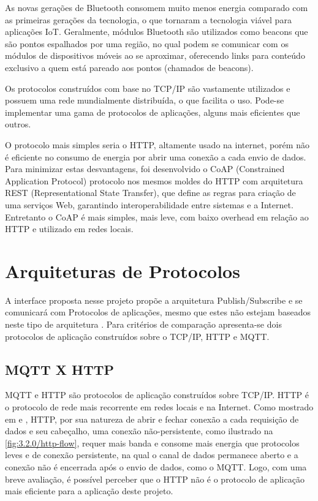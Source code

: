 As novas gerações de Bluetooth consomem muito menos energia comparado com as primeiras gerações da tecnologia, o que tornaram a tecnologia viável para aplicações IoT. Geralmente, módulos Bluetooth são utilizados como beacons \cite{Endeavor:Beacons} que são  pontos espalhados por uma região, no qual podem se comunicar com os módulos de dispositivos móveis ao se aproximar, oferecendo links para conteúdo exclusivo a quem está pareado aos pontos (chamados de beacons).

Os protocolos construídos com base no TCP/IP são vastamente utilizados e possuem uma rede mundialmente distribuída, o que facilita o uso. Pode-se implementar uma gama de protocolos de aplicações, alguns mais eficientes que outros.

O protocolo mais simples seria o HTTP, altamente usado na internet, porém não é eficiente no consumo de energia por abrir uma conexão a cada envio de dados. Para minimizar estas desvantagens, foi desenvolvido o CoAP (Constrained Application Protocol) \cite{coap} protocolo nos mesmos moldes do HTTP com arquitetura REST (Representational State Transfer), que define as regras para criação de uma serviços Web, garantindo interoperabilidade entre sistemas e a Internet. Entretanto o CoAP é mais simples, mais leve, com baixo overhead em relação ao HTTP e utilizado em redes locais.

\section{Arquiteturas de Protocolos}
\label{section:arquitetura_protocolo}


A interface proposta nesse projeto propõe a arquitetura Publish/Subscribe e se comunicará com Protocolos de aplicações, mesmo que estes não estejam baseados neste tipo de arquitetura . Para critérios de comparação apresenta-se dois protocolos de aplicação construídos sobre o TCP/IP, HTTP e MQTT.

\subsection{MQTT X HTTP}
\label{subsection:mqttxhttp}

MQTT e HTTP são protocolos de aplicação construídos sobre TCP/IP.  HTTP é o protocolo de rede mais recorrente em redes locais e na Internet. Como mostrado em \cite{Tetsuya-Sasaki} e \cite{Naik}, HTTP, por sua natureza de abrir e fechar conexão a cada requisição de dados e seu cabeçalho, uma conexão não-persistente, como ilustrado na \ref{fig:3.2.0/http-flow}, requer mais banda e consome mais energia que protocolos leves e de conexão persistente, na qual o canal de dados permanece aberto e a conexão não é encerrada após o envio de dados, como o MQTT.  Logo, com uma breve avaliação, é possível perceber que o HTTP não é o protocolo de aplicação mais eficiente para a aplicação deste projeto.

